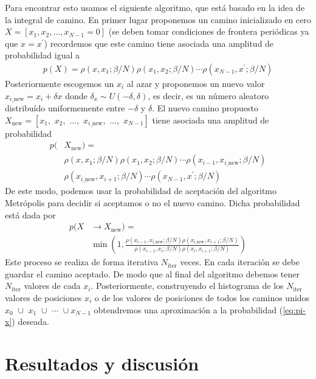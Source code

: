 \documentclass[%
 reprint,
 amsmath,amssymb,
 aps,
 pra,
]{revtex4-2}
\begin{document}
Para encontrar esto usamos el siguiente algoritmo, que está basado en la idea de la integral de camino. En primer lugar proponemos un camino inicializado en cero $X = [x_1, x_2, \dots, x_{N-1} = 0]$ (se deben tomar condiciones de frontera periódicas ya que $x = x^\prime$) recordemos que este camino tiene asociada una amplitud de probabilidad igual a  
\begin{align}
	p(X) = \rho (x,x_1; \beta/N) \rho (x_1,x_2; \beta/N) \cdots \rho (x_{N-1},x^{\prime}; \beta/N)
\end{align}
Posteriormente escogemos un $x_i$ al azar y proponemos un nuevo valor $x_{i\_\mathrm{new}} = x_i + \delta x$ donde $\delta_x \sim U(-\delta,\delta)$, es decir, es un número aleatoro distribuído uniformemente entre $-\delta$ y $\delta$. El nuevo camino propuesto $X_\mathrm{new}=[x_1,\,\,x_2,\,\,\dots,\,\,x_{i\_\mathrm{new}},\,\,\dots,\,\,x_{N-1}]$ tiene asociada una amplitud de probabilidad 
\begin{align}
	p(&X_\mathrm{new}) = \nonumber \\
	&\rho (x,x_1; \beta/N) \rho (x_1,x_2; \beta/N) \cdots \rho (x_{i-1},x_{i\_\mathrm{new}}; \beta/N) \nonumber \\
	&\rho (x_{i\_\mathrm{new}},x_{i+1}; \beta/N) \cdots \rho (x_{N-1},x^{\prime}; \beta/N)
\end{align}
De este modo, podemos usar la probabilidad de aceptación del algoritmo Metrópolis para decidir si aceptamos o no el nuevo camino. Dicha probabilidad está dada por
\begin{align}
p(X & \rightarrow  X_\mathrm{new}) = \nonumber \\
&\min\left(1,\frac{\rho (x_{i-1},x_{i\_\mathrm{new}}; \beta/N) \rho (x_{i\_\mathrm{new}},x_{i+1}; \beta/N) }{\rho (x_{i-1},x_i; \beta/N) \rho (x_i,x_{i+1}; \beta/N)}\right)
\end{align} 
Este proceso se realiza de forma iterativa $N_\mathrm{iter}$ veces.
En cada iteración se debe guardar el camino aceptado. De modo que al final del algoritmo debemos tener $N_\mathrm{iter}$ valores de cada $x_i$. Posteriormente, construyendo el histograma de los $N_\mathrm{iter}$ valores de posiciones $x_i$ o de los valores de posiciones de todos los caminos unidos $x_0\,\, \cup \,\, x_1 \,\, \cup \,\, \cdots \,\, \cup x_{N-1}$  obtendremos una aproximación a la probabilidad (\ref{eq:pi-x}) deseada. 




\section{\label{sec:Resultados}Resultados y discusión}
\end{document}
